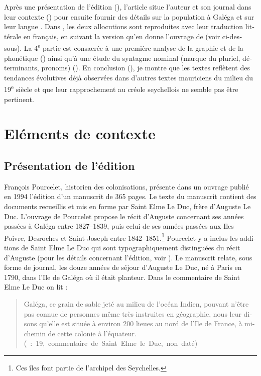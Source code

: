 \documentclass[output=paper]{langscibook}
\begin{document}
\begin{otherlanguage}{french}
Après une présentation de l’édition (), l’article situe l’auteur et son journal dans leur contexte () pour ensuite fournir des détails sur la population à Galéga et sur leur langue {}. Dans , les deux allocutions sont reproduites avec leur traduction littérale en français, en suivant la version qu’en donne l’ouvrage de \citet{Pourcelet1994} (voir ci-dessous). La 4\textsuperscript{e} partie est consacrée à une première analyse de la graphie et de la phonétique () ainsi qu’à une étude du syntagme nominal (marque du pluriel, déterminants, pronoms) (). En conclusion (), je montre que les textes reflètent des tendances évolutives déjà observées dans d’autres textes mauriciens du milieu du 19\textsuperscript{e} siècle et que leur rapprochement au créole seychellois ne semble pas être pertinent.

\section{Eléments de contexte}\label{sec:kriegel:2}
\subsection{Présentation de l’édition}\label{sec:kriegel:2.1}


François Pourcelet, historien des colonisations, présente dans un ouvrage publié en 1994 l’édition d’un manuscrit de 365 pages. Le texte du manuscrit contient des documents recueillis et mis en forme par Saint Elme Le Duc, frère d’Auguste Le Duc. L’ouvrage de Pourcelet propose le récit d’Auguste concernant ses années passées à Galéga entre 1827–1839, puis celui de ses années passées aux Iles Poivre, Desroches et Saint-Joseph entre 1842–1851.\footnote{Ces îles font partie de l’archipel des Seychelles.} Pourcelet y a inclus les additions de Saint Elme Le Duc qui sont typographiquement distinguées du récit d’Auguste (pour les détails concernant l’édition, voir \citealt{Chaudenson1995}). Le manuscrit relate, sous forme de journal, les douze années de séjour d’Auguste Le Duc, né à Paris en 1790, dans l’Ile de Galéga où il était planteur. Dans le commentaire de Saint Elme Le Duc on lit :

\begin{quote}
Galéga, ce grain de sable jeté au milieu de l’océan Indien, pouvant n’être pas connue de personnes même très instruites en géographie, nous leur disons qu’elle est située à environ 200 lieues au nord de l’Ile de France, à mi-chemin de cette colonie à l’équateur.\\\hbox{}\hfill\hbox{(\citealt{Pourcelet1994} : 19, commentaire de Saint Elme le Duc, non daté)}
\end{quote}



\end{otherlanguage}
\end{document}
